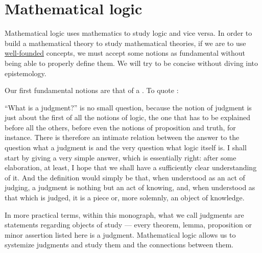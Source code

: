 \section{Mathematical logic}\label{sec:mathematical_logic}

Mathematical logic uses mathematics to study logic and vice versa. In order to build a mathematical theory to study mathematical theories, if we are to use \hyperref[rem:well_founded_relation]{well-founded} concepts, we must accept some notions as fundamental without being able to properly define them. We will try to be concise without diving into epistemology.

\begin{definition}\label{def:judgement}
  Our first fundamental notions are that of a . To quote :
  \begin{displayquote}
    \enquote{What is a judgment?} is no small question, because the notion of judgment is just about the first of all the notions of logic, the one that has to be explained before all the others, before even the notions of proposition and truth, for instance. There is therefore an intimate relation between the answer to the question what a judgment is and the very question what logic itself is. I shall start by giving a very simple answer, which is essentially right: after some elaboration, at least, I hope that we shall have a sufficiently clear understanding of it. And the definition would simply be that, when understood as an act of judging, a judgment is nothing but an act of knowing, and, when understood as that which is judged, it is a piece or, more solemnly, an object of knowledge.
  \end{displayquote}
\end{definition}
\begin{comments}
  \item In more practical terms, within this monograph, what we call judgments are statements regarding objects of study --- every theorem, lemma, proposition or minor assertion listed here is a judgment. Mathematical logic allows us to systemize judgments and study them and the connections between them.
\end{comments}

